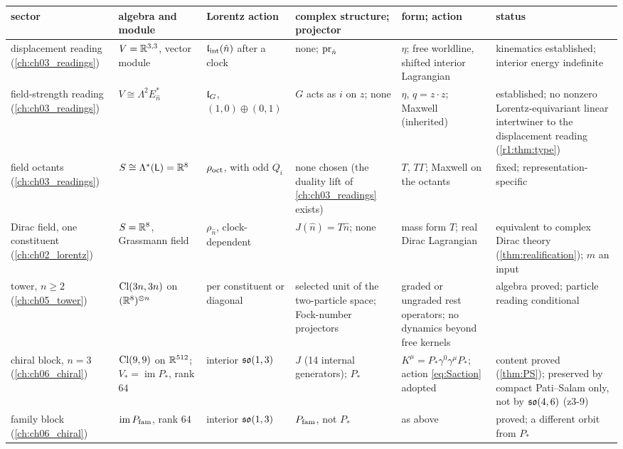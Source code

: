 \begin{table}[p]
\centering
\scriptsize
\begin{tabular}{@{}>{\raggedright\arraybackslash}p{1.9cm}>{\raggedright\arraybackslash}p{2.3cm}>{\raggedright\arraybackslash}p{1.8cm}>{\raggedright\arraybackslash}p{2.0cm}>{\raggedright\arraybackslash}p{2.5cm}>{\raggedright\arraybackslash}p{3.2cm}@{}}
\toprule
sector & algebra and module & Lorentz action & complex structure; projector & form; action & status\\
\midrule
displacement reading (\cref{ch:ch03_readings}) & $V=\mathbb{R}^{3,3}$, vector module & $\mathfrak l_{\rm int}(\hat n)$ after a clock & none; $\operatorname{pr}_{\hat n}$ & $\eta$; free worldline, shifted interior Lagrangian & kinematics established; interior energy indefinite\\
field-strength reading (\cref{ch:ch03_readings}) & $V\cong\Lambda^2E_{\hat n}^*$ & $\mathfrak l_G$, $(1,0)\oplus(0,1)$ & $G$ acts as $i$ on $z$; none & $\eta$, $q=z\cdot z$; Maxwell (inherited) & established; no nonzero Lorentz-equivariant linear intertwiner to the displacement reading (\cref{r1:thm:type})\\
field octants (\cref{ch:ch03_readings}) & $S\cong\Lambda^*(\mathsf L)=\mathbb{R}^8$ & $\rho_{\rm oct}$, with odd $Q_i$ & none chosen (the duality lift of \cref{ch:ch03_readings} exists) & $T$, $T\Gamma$; Maxwell on the octants & fixed; representation-specific\\
Dirac field, one constituent (\cref{ch:ch02_lorentz}) & $S=\mathbb{R}^8$, Grassmann field & $\rho_{\hat n}$, clock-dependent & $J(\hat n)=T\hat n$; none & mass form $T$; real Dirac Lagrangian & equivalent to complex Dirac theory (\cref{thm:realification}); $m$ an input\\
tower, $n\ge2$ (\cref{ch:ch05_tower}) & $\mathrm{Cl}(3n,3n)$ on $(\mathbb{R}^8)^{\otimes n}$ & per constituent or diagonal & selected unit of the two-particle space; Fock-number projectors & graded or ungraded rest operators; no dynamics beyond free kernels & algebra proved; particle reading conditional\\
chiral block, $n=3$ (\cref{ch:ch06_chiral}) & $\mathrm{Cl}(9,9)$ on $\mathbb{R}^{512}$; $V_*=\operatorname{im}P_*$, rank $64$ & interior $\mathfrak{so}(1,3)$ & $J$ (14 internal generators); $P_*$ & $K^\mu=P_*\gamma^0\gamma^\mu P_*$; action \eqref{eq:Saction} adopted & content proved (\cref{thm:PS}); preserved by compact Pati--Salam only, not by $\mathfrak{so}(4,6)$ (z3-9)\\
family block (\cref{ch:ch06_chiral}) & $\operatorname{im}P_{\rm fam}$, rank $64$ & interior $\mathfrak{so}(1,3)$ & $P_{\rm fam}$, not $P_*$ & as above & proved; a different orbit from $P_*$\\

\end{tabular}
\end{table}

